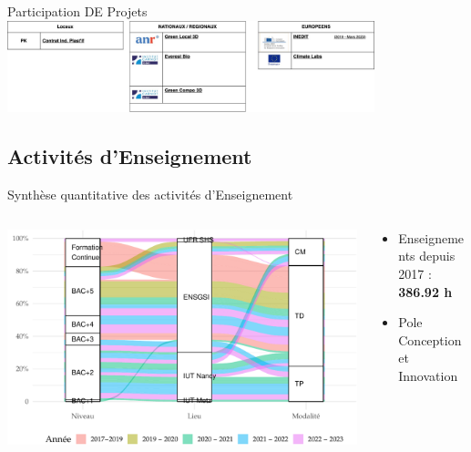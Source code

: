 \documentclass[
  11pt,
  ignorenonframetext,
  aspectratio=169,
  c]{beamer}
\begin{document}
\begin{frame}{Participation DE Projets}
\protect\hypertarget{participation-de-projets}{}
\includegraphics[width=0.8\textwidth,height=\textheight]{Figures/slides/Projects.jpg}
\end{frame}

\hypertarget{activituxe9s-denseignement}{%
\subsection{Activités d'Enseignement}\label{activituxe9s-denseignement}}

\begin{frame}{Synthèse quantitative des activités d'Enseignement}
\protect\hypertarget{synthuxe8se-quantitative-des-activituxe9s-denseignement}{}
\begin{columns}[T]
\begin{column}[c]{0.6\textwidth}
\includegraphics{figures/fig-sankey-1.pdf}
\end{column}

\begin{column}[c]{0.4\textwidth}
\begin{itemize}
\item
  Enseignements depuis 2017 : \textbf{386.92 h}
\item
  Pole Conception et Innovation
\end{itemize}
\end{column}
\end{columns}
\end{frame}
\end{document}

